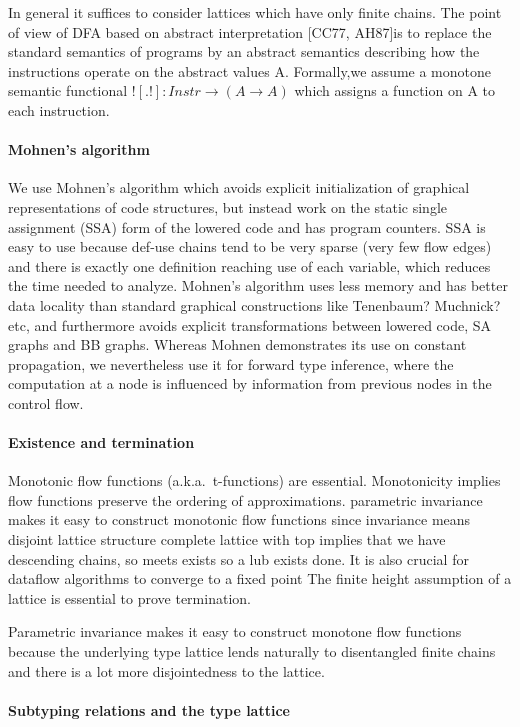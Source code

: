 \documentclass[pldi]{sigplanconf-pldi15}
\begin{document}
In general it suffices to consider lattices which have only finite chains. The
point of view of DFA based on abstract interpretation [CC77, AH87]is to replace
the standard semantics of programs by an abstract semantics describing how the
instructions operate on the abstract values A. Formally,we assume a
monotone semantic functional $![.!] : Instr \rightarrow (A \rightarrow A)$
which assigns a function on A to each instruction.

\paragraph{Mohnen's algorithm}
We use Mohnen's algorithm which avoids explicit initialization of graphical
representations of code structures, but instead work on the static single
assignment (SSA) form of the lowered code and has program counters. SSA is easy
to use because def-use chains tend to be very sparse (very few flow edges) and
there is exactly one definition reaching use of each variable, which reduces
the time needed to analyze. Mohnen's algorithm uses less memory and has better
data locality than standard graphical constructions like Tenenbaum? Muchnick?
etc, and furthermore avoids explicit transformations between lowered code, SA
graphs and BB graphs. Whereas Mohnen demonstrates its use on constant
propagation, we nevertheless use it for forward type inference, where the
computation at a node is influenced by information from previous nodes in the
control flow.

\paragraph{Existence and termination}
Monotonic flow functions (a.k.a.\ t-functions) are essential.
Monotonicity implies flow functions preserve the ordering of approximations.
parametric invariance makes it easy to construct monotonic flow functions since invariance means disjoint lattice structure
complete lattice with top implies that we have descending chains, so meets exists so a lub exists done.
It is also crucial for dataflow algorithms to converge to a fixed point
The finite height assumption of a lattice is essential to prove termination.

Parametric invariance makes it easy to construct monotone flow functions
because the underlying type lattice lends naturally to disentangled finite
chains and there is a lot more disjointedness to the lattice.

\paragraph{Subtyping relations and the type lattice}
\end{document}
